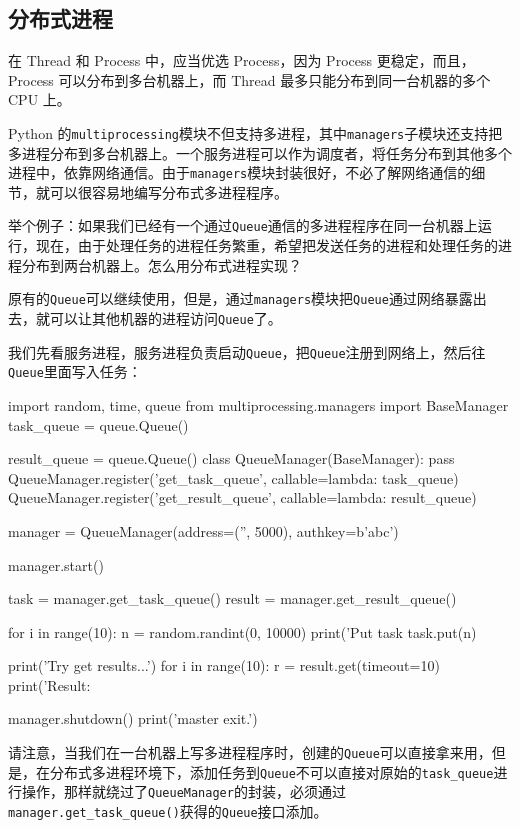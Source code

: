 \hypertarget{ux5206ux5e03ux5f0fux8fdbux7a0b}{%
\subsection{分布式进程}\label{ux5206ux5e03ux5f0fux8fdbux7a0b}}

在 Thread 和 Process 中，应当优选 Process，因为 Process
更稳定，而且，Process 可以分布到多台机器上，而 Thread
最多只能分布到同一台机器的多个 CPU 上。

Python
的\texttt{multiprocessing}模块不但支持多进程，其中\texttt{managers}子模块还支持把多进程分布到多台机器上。一个服务进程可以作为调度者，将任务分布到其他多个进程中，依靠网络通信。由于\texttt{managers}模块封装很好，不必了解网络通信的细节，就可以很容易地编写分布式多进程程序。

举个例子：如果我们已经有一个通过\texttt{Queue}通信的多进程程序在同一台机器上运行，现在，由于处理任务的进程任务繁重，希望把发送任务的进程和处理任务的进程分布到两台机器上。怎么用分布式进程实现？

原有的\texttt{Queue}可以继续使用，但是，通过\texttt{managers}模块把\texttt{Queue}通过网络暴露出去，就可以让其他机器的进程访问\texttt{Queue}了。

我们先看服务进程，服务进程负责启动\texttt{Queue}，把\texttt{Queue}注册到网络上，然后往\texttt{Queue}里面写入任务：

\begin{pythoncode}
import random, time, queue
from multiprocessing.managers import BaseManager
task_queue = queue.Queue()

result_queue = queue.Queue()
class QueueManager(BaseManager):
    pass
QueueManager.register('get_task_queue', callable=lambda: task_queue)
QueueManager.register('get_result_queue', callable=lambda: result_queue)

manager = QueueManager(address=('', 5000), authkey=b'abc')

manager.start()

task = manager.get_task_queue()
result = manager.get_result_queue()

for i in range(10):
    n = random.randint(0, 10000)
    print('Put task %
    task.put(n)

print('Try get results...')
for i in range(10):
    r = result.get(timeout=10)
    print('Result: %

manager.shutdown()
print('master exit.')
\end{pythoncode}

请注意，当我们在一台机器上写多进程程序时，创建的\texttt{Queue}可以直接拿来用，但是，在分布式多进程环境下，添加任务到\texttt{Queue}不可以直接对原始的\texttt{task\_queue}进行操作，那样就绕过了\texttt{QueueManager}的封装，必须通过\texttt{manager.get\_task\_queue()}获得的\texttt{Queue}接口添加。

